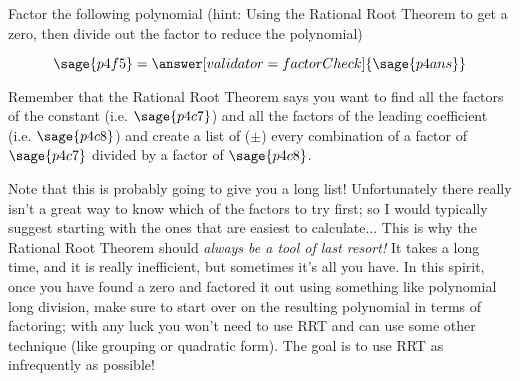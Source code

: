 \documentclass{ximera}
\begin{document}
\begin{problem}
    
    Factor the following polynomial (hint: Using the Rational Root Theorem to get a zero, then divide out the factor to reduce the polynomial)
    
    \[
        \sage{p4f5} = \answer[validator=factorCheck]{\sage{p4ans}}
    \]
    \begin{feedback}
        Remember that the Rational Root Theorem says you want to find all the factors of the constant (i.e. $\sage{p4c7}$) and all the factors of the leading coefficient (i.e. $\sage{p4c8}$) and create a list of ($\pm$) every combination of a factor of $\sage{p4c7}$ divided by a factor of $\sage{p4c8}$. 
        
        Note that this is probably going to give you a long list! Unfortunately there really isn't a great way to know which of the factors to try first; so I would typically suggest starting with the ones that are easiest to calculate... This is why the Rational Root Theorem should \textit{always be a tool of last resort!} It takes a long time, and it is really inefficient, but sometimes it's all you have. In this spirit, once you have found a zero and factored it out using something like polynomial long division, make sure to start over on the resulting polynomial in terms of factoring; with any luck you won't need to use RRT and can use some other technique (like grouping or quadratic form). The goal is to use RRT as infrequently as possible!
    \end{feedback}
    
\end{problem}
\end{document}
